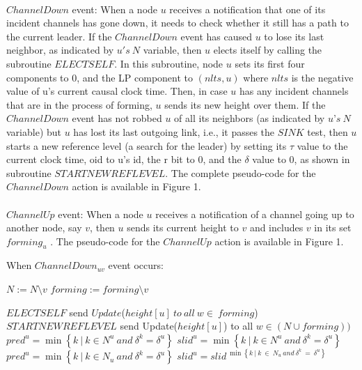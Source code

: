 \paragraph{}$ChannelDown$ event: When a node $u$ receives a notification that one of its incident channels has gone down, it needs to check whether it still has a path to the current leader. If the $ChannelDown$ event has caused $u$ to lose its last neighbor, as indicated by $u's~N$ variable, then $u$ elects itself by calling the subroutine $ELECTSELF$. In this subroutine, node $u$ sets its first four components to 0, and the LP component to $(nlts,u)$ where $nlts$ is the negative value of u’s current causal clock time. Then, in case $u$ has any incident channels that are in the process of forming, $u$ sends its new height over them. If the $ChannelDown$ event has not robbed $u$ of all its neighbors (as indicated by $u’s~N$ variable) but $u$ has lost its last outgoing link, i.e., it passes the $SINK$ test, then $u$ starts a new reference level (a search for the leader) by setting its $\tau$ value to the current clock time, oid to u’s id, the r bit to 0, and the $\delta$ value to $0$, as shown in subroutine $STARTNEWREFLEVEL$. The complete pseudo-code for the $ChannelDown$ action is available in Figure 1.

\paragraph{}$ChannelUp$ event: When a node $u$ receives a notification of a channel going up to another node, say $v$, then $u$ sends its current height to $v$ and includes $v$ in its set $forming_u$ . The pseudo-code for the $ChannelUp$ action is available in Figure 1.

\begin{algorithm}
	\caption{When $ChannelDown_{uv}$ event occurs:}
	\begin{algorithmic}[1]
		
		\State $N := N \setminus {v}$
		\State $forming := forming \setminus {v}$
		
		\State $ELECTSELF$
		\State send $Update$($height[u]~to~all~w\in ~forming$)
		\State $STARTNEWREFLEVEL$
		\State send Update($height[u]$) to all $w \in (N \cup forming))$
		\State $pred^u = \min \left\lbrace  k~|~k \in N^u~and~\delta ^k = \delta ^u \right\rbrace  $
		\State $slid^u =  \min \left\lbrace  k~|~k \in N^u~and~\delta ^k = \delta ^u \right\rbrace$
		\State $pred^u = \min \left\lbrace  k~|~k \in N_u~and~\delta ^k = \delta ^u \right\rbrace  $
		\State $slid^u = slid^{~\min \left\lbrace  k~|~k~\in~ N_u~and~\delta ^k~=~\delta ^u \right\rbrace}$
		\EndIf
		
		
	\end{algorithmic}

\end{algorithm}

